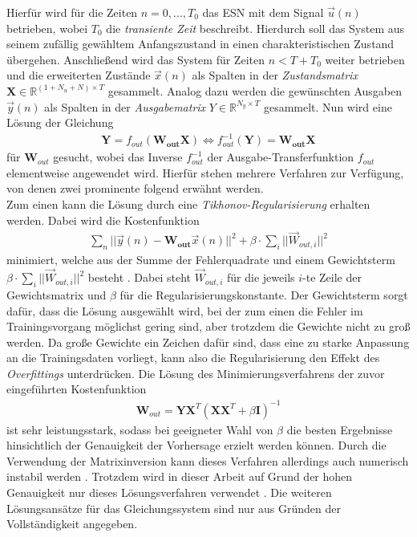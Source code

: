 Hierfür wird für die Zeiten $n=0, ..., T_0$ das \textsc{ESN} mit dem Signal $\vec{u}(n)$ betrieben, wobei $T_0$ die \textit{transiente Zeit} beschreibt. Hierdurch soll das System aus seinem zufällig gewähltem Anfangszustand in einen charakteristischen Zustand übergehen. Anschließend wird das System für Zeiten $n < T + T_0$ weiter betrieben und die erweiterten Zustände $\vec{x}(n)$ als Spalten in der \textit{Zustandsmatrix} $\mathbf{X} \in \mathbb{R}^{(1 + N_u + N) \times T}$ gesammelt. Analog dazu werden die gewünschten Ausgaben $\vec{y}(n)$ als Spalten in der \textit{Ausgabematrix} $Y \in \mathbb{R}^{N_y \times T}$ gesammelt.
Nun wird eine Lösung der Gleichung
\begin{align}
\mathbf{Y} = f_{out} \left( \mathbf{W_{out}} \mathbf{X} \right) \Leftrightarrow f_{out}^{-1} \left( \mathbf{Y} \right) = \mathbf{W_{out}}\mathbf{X}
\end{align}
für $\mathbf{W}_{out}$ gesucht, wobei das Inverse $f^{-1}_{out}$ der Ausgabe-Transferfunktion $f_{out}$ elementweise angewendet wird. Hierfür stehen mehrere Verfahren zur Verfügung, von denen zwei prominente folgend erwähnt werden.\\
Zum einen kann die Lösung durch eine \textit{Tikhonov-Regularisierung} erhalten werden. Dabei wird die Kostenfunktion 
\begin{align}
\sum_n ||\vec{y}(n) - \mathbf{W_{out}}\vec{x}(n)||^2 + \beta \cdot \sum_i ||\vec{W}_{out, i}||^2
\end{align}
minimiert, welche aus der Summe der Fehlerquadrate und einem Gewichtsterm $\beta \cdot \sum_i ||\vec{W}_{out, i}||^2$ besteht \citep{lukovsevivcius2012practical}. Dabei steht $\vec{W}_{out, i}$ für die jeweils $i$-te Zeile der Gewichtsmatrix und $\beta$ für die Regularisierungskonstante. Der Gewichtsterm sorgt dafür, dass die Lösung ausgewählt wird, bei der zum einen die Fehler im Trainingsvorgang möglichst gering sind, aber trotzdem die Gewichte nicht zu groß werden. Da große Gewichte ein Zeichen dafür sind, dass eine zu starke Anpassung an die Trainingsdaten vorliegt, kann also die Regularisierung den Effekt des \textit{Overfittings} unterdrücken. Die Lösung des Minimierungsverfahrens der zuvor eingeführten Kostenfunktion
\begin{align}
\label{eq:tikhonov}
\mathbf{W}_{out} = \mathbf{Y} \mathbf{X}^T \left(\mathbf{X} \mathbf{X}^T + \beta \mathbf{I} \right)^{-1}
\end{align}
ist sehr leistungsstark, sodass bei geeigneter Wahl von $\beta$ die besten Ergebnisse hinsichtlich der Genauigkeit der Vorhersage erzielt werden können. Durch die Verwendung der Matrixinversion kann dieses Verfahren allerdings auch numerisch instabil werden \cite{lukoseviciusa2009}. Trotzdem wird in dieser Arbeit auf Grund der hohen Genauigkeit nur dieses Lösungsverfahren verwendet \citep{lukovsevivcius2012practical}. Die weiteren Lösungsansätze für das Gleichungssystem sind nur aus Gründen der Vollständigkeit angegeben.\\

